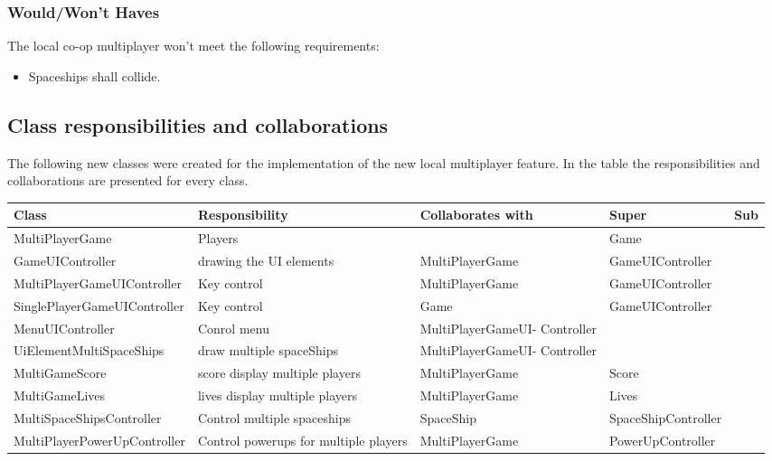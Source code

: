 \documentclass[10pt]{article}
\begin{document}
\subsubsection{Would/Won't Haves}
The local co-op multiplayer won't meet the following requirements:
\begin{itemize}
	\item Spaceships shall collide.
\end{itemize}
\newpage

\subsection{Class responsibilities and collaborations}


The following new classes were created for the implementation of the new local multiplayer feature.
In the table the responsibilities and collaborations are presented for every class.
\begin{center}
    \begin{tabular}{ | p{4.5cm} | p{3cm} | p{3cm} | p{3cm} | p{1cm} |}
  \hline
    Class & Responsibility & Collaborates with & Super & Sub \\ \hline
   MultiPlayerGame & Players  & & Game & \\ \hline
   GameUIController & drawing the UI elements & MultiPlayerGame  & GameUIController  & \\ \hline
 MultiPlayerGameUIController & Key control & MultiPlayerGame  & GameUIController  & \\ \hline
 SinglePlayerGameUIController & Key control & Game  & GameUIController  & \\ \hline
   MenuUIController& Conrol menu & MultiPlayerGameUI- Controller  &   &  \\ \hline
   UiElementMultiSpaceShips& draw multiple spaceShips & MultiPlayerGameUI- Controller  &  &  \\ \hline
 MultiGameScore & score display multiple players &  MultiPlayerGame  &  Score  & \\ \hline
 MultiGameLives &  lives display multiple players & MultiPlayerGame  & Lives  & \\ \hline
 MultiSpaceShipsController& Control multiple spaceships & SpaceShip  & SpaceShipController &  \\ \hline
 MultiPlayerPowerUpController& Control powerups for multiple players & MultiPlayerGame   & PowerUpController &  \\ \hline

    \end{tabular}
\end{center}
\end{document}
